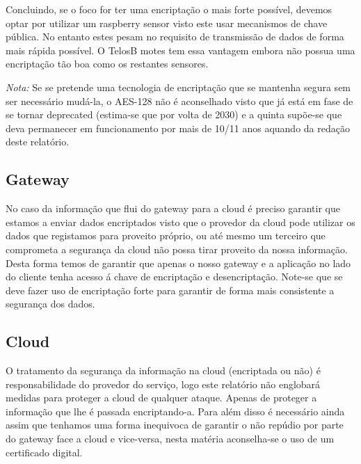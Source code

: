 \par Concluindo, se o foco for ter uma encriptação o mais forte possível, devemos optar por utilizar um raspberry sensor visto este usar mecanismos de chave pública. No entanto estes pesam no requisito de transmissão de dados de forma mais rápida possível. O TelosB motes tem essa vantagem embora não possua uma encriptação tão boa como os restantes sensores.\newline


\textit{Nota:} Se se pretende uma tecnologia de encriptação que se mantenha segura sem ser necessário mudá-la, o AES-128 não é aconselhado visto que já está em fase de se tornar deprecated (estima-se que por volta de 2030) e a quinta supõe-se que deva permanecer em funcionamento por mais de 10/11 anos aquando da redação deste relatório.\newline



\subsection{Gateway}
\par\hfill
\par No caso da informação que flui do gateway para a cloud é preciso garantir que estamos a enviar dados encriptados visto que o provedor da cloud pode utilizar os dados que registamos para proveito próprio, ou até mesmo um terceiro que comprometa a segurança da cloud não possa tirar proveito da nossa informação. Desta forma temos de garantir que apenas o nosso gateway e a aplicação no lado do cliente tenha acesso á chave de encriptação e desencriptação. Note-se que se deve fazer uso de encriptação forte para garantir de forma mais consistente a segurança dos dados.\newline

\newpage
\subsection{Cloud}
\par\hfill
\par O tratamento da segurança da informação na cloud (encriptada ou não) é responsabilidade do provedor do serviço, logo este relatório não englobará medidas para proteger a cloud de qualquer ataque. Apenas de proteger a informação que lhe é passada encriptando-a.\newline
Para além disso é necessário ainda assim que tenhamos uma forma inequivoca de garantir o não repúdio por parte do gateway face a cloud e vice-versa, nesta matéria aconselha-se o uso de um certificado digital.\newline 



